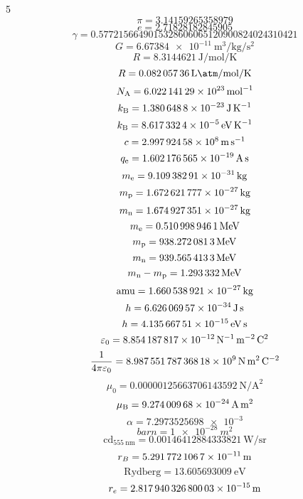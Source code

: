\documentclass[a4paper]{article}
\newcommand*\titlet[1]{\textbf{\xmakefirstuc{#1}}}
\newenvironment{formulae}[2]{%
\vspace{-19pt}
\begin{multicols}{#1}
\noindent\titlet{#2}}
{\end{multicols}}
\begin{document}
\begin{formulae}{5}{constants, units}
	\[\pi=\num{3.14159265358979}\]
	\[e=\num{2.71828182845905}\]
	\[\gamma=\num{0.5772156649015328606065120900824024310421}\]
	\[G=\SI{6.67384e-11}{\m\cubed\per\kg\per\s\squared}\]
	\[R=\SI{8.3144621}{\J\per\mol\per\K}\]
	\[R=\SI{0.08205736}{\l\atm\per\mol\per\K}\]
	\[N_\text A=\SI{6.02214129 E+23}{\per\mol}\]
	\[k_\text B=\SI{1.3806488 E-23}{\J\per\K}\]
	\[k_\text B=\SI{8.6173324 E-5}{\eV\per\K}\]
	\[c=\SI{2.99792458 E+8}{\m\per\s}\]
	\[q_\text e=\SI{1.602176565 E-19}{\A\s}\]
	\[m_\text e=\SI{9.10938291 E-31}{\kg}\]
	\[m_\text p=\SI{1.672621777 E-27}{\kg}\]
	\[m_\text n=\SI{1.674927351 E-27}{\kg}\]
	\[m_\text e=\SI{0.5109989461}{\MeV}\]
	\[m_\text p=\SI{938.2720813}{\MeV}\]
	\[m_\text n=\SI{939.5654133}{\MeV}\]
	\[m_\text n-m_\text p=\SI{1.293332}{\MeV}\]
	\[\text{amu}=\SI{1.660538921 E-27}{\kg}\]
	\[h=\SI{6.62606957 E-34}{\J\s}\]
	\[h=\SI{4.13566751 E-15}{\eV\s}\]
	\[\varepsilon_0=\SI{8.854187817 E-12}{\per\newton\per\metre\squared\coulomb\squared}\]
	\[\frac1{4\pi\varepsilon_0}=\SI{8.98755178736818 E+9}{\newton\metre\squared\per\coulomb\squared}\]
	\[\mu_0=\SI{0.00000125663706143592}{\N\per\A\squared}\]
	\[\mu_\text B=\SI{9.27400968 E-24}{\A\m\squared}\]
	\[\alpha=\num{7.2973525698e-3}\]
	\[\si{barn}=\SI{1e-28}{m^2}\]
	\[\si{\candela}_{\SI[scientific-notation=false]{555}{\nano\metre}}=\SI{0.00146412884333821}{\watt\per\steradian}\]
	\[r_B=\SI{5.2917721067 E-11}{\m}\]
	\[\text{Rydberg}=\SI{13.605693009}\eV\]
	\[r_e=\SI{2.81794032680003 E-15}{m}\]
\end{formulae}
\end{document}
